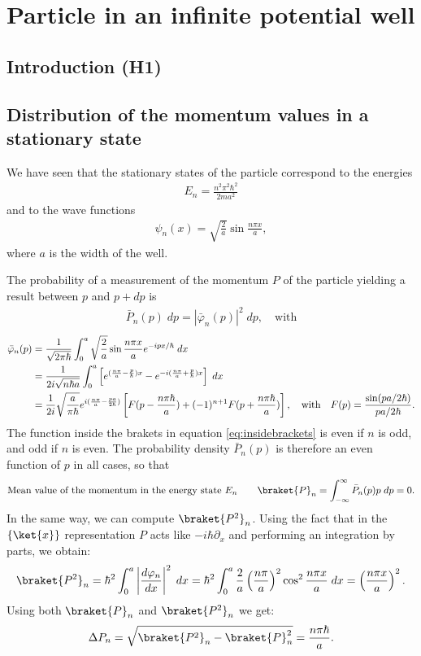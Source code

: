 \section{Particle in an infinite potential well}

\subsection{Introduction (H1)}


\subsection{Distribution of the momentum values in a stationary state}
We have seen that the stationary states of the particle correspond to the energies
\begin{align}
    E_n=\frac{n^2\pi^2\hbar^2}{2ma^2}
\end{align}
and to the wave functions
\begin{align}
    \psi_n(x)=\sqrt{\frac{2}{a}}\sin\frac{n\pi x}{a},
\end{align}
where $a$ is the width of the well.

The probability of a measurement of the momentum $P$ of the particle yielding a result between $p$ and $p+dp$ is
\begin{align}
    \bar{P}_n(p)\;dp=|\bar{\varphi}_n(p)|^2\;dp,\quad\text{with}
\end{align}
\begin{align}
    \bar{\varphi}_n(p)&=\frac{1}{\sqrt{2\pi\hbar}}\int_0^a\sqrt{\frac{2}{a}}\sin\frac{n\pi x}{a}e^{-ipx/\hbar}\;dx\notag\\
    &=\frac{1}{2i\sqrt{n\hbar a}}\int_0^a\left[e^{(\frac{n\pi}{a}-\frac{p}{\hbar})x}-e^{-i(\frac{n\pi}{a}+\frac{p}{\hbar})x}\right]\;dx\label{eq:insidebrackets}\\
    &=\frac{1}{2i}\sqrt{\frac{a}{\pi\hbar}}e^{i(\frac{n\pi}{a}-\frac{pa}{2\hbar})}\left[F(p-\frac{n\pi\hbar}{a})+(-1)^{n+1}F(p+\frac{n\pi\hbar}{a})\right],\quad\text{with}\quad F(p)=\frac{\sin(pa/2\hbar)}{pa/2\hbar}.\notag
\end{align}
The function inside the brakets in equation \eqref{eq:insidebrackets} is even if $n$ is odd, and odd if $n$ is even. The probability density $\bar{P}_n(p)$ is therefore an even function of $p$ in all cases, so that
\begin{align}
    \text{Mean value of the momentum in the energy state $E_n$}\qquad\braket{P}_n=\int_{-\infty}^\infty\bar{P}_n(p)p\;dp=0.
\end{align}
In the same way, we can compute $\braket{P^2}_n$. Using the fact that in the $\{\ket{x}\}$ representation $P$ acts like $-i\hbar\partial_x$ and performing an integration by parts,
we obtain:
\begin{align}
    \braket{P^2}_n=\hbar^2\int_0^a\left|\frac{d\varphi_n}{dx}\right|^2\;dx=\hbar^2\int_0^a\frac{2}{a}\left(\frac{n\pi}{a}\right)^2\cos^2\frac{n\pi x}{a}\;dx=\left(\frac{n\pi x}{a}\right)^2.
\end{align}
Using both $\braket{P}_n$ and $\braket{P^2}_n$ we get:
\begin{align*}
    \Delta P_n=\sqrt{\braket{P^2}_n-\braket{P}_n^2}=\frac{n\pi\hbar}{a}.
\end{align*}

